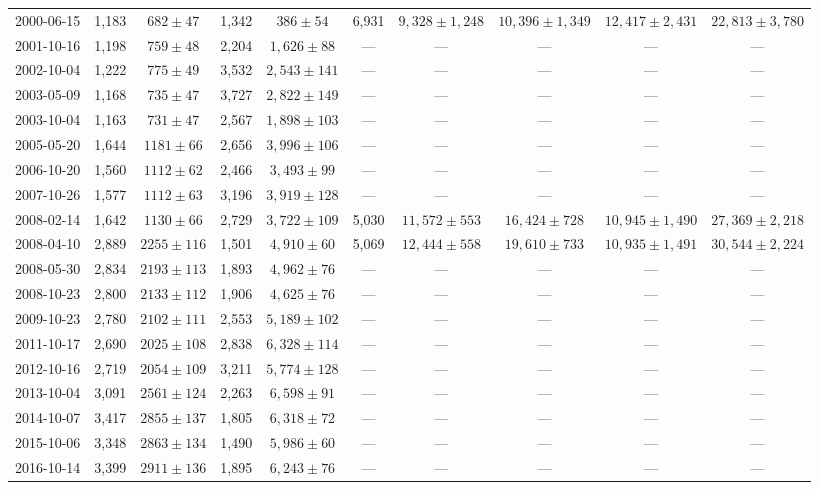 \begin{landscape}
\begin{longtable}{cccccccccc}
{2000-06-15} & 1,183 & {$682  \pm  47$} & 1,342 & {$386 \pm 54$} & 6,931 & {$9,328 \pm 1,248$} & {$10,396 \pm 1,349$} & {$12,417 \pm 2,431$} & {$22,813 \pm 3,780$} \\
{2001-10-16} & 1,198 & {$759  \pm  48$} & 2,204 & {$1,626 \pm 88$} & --- & --- & --- & --- & --- \\
{2002-10-04} & 1,222 & {$775  \pm  49$} & 3,532 & {$2,543 \pm 141$} & --- & --- & --- & --- & --- \\
{2003-05-09} & 1,168 & {$735  \pm  47$} & 3,727 & {$2,822 \pm 149$} & --- & --- & --- & --- & --- \\
{2003-10-04} & 1,163 & {$731  \pm  47$} & 2,567 & {$1,898 \pm 103$} & --- & --- & --- & --- & --- \\
{2005-05-20} & 1,644 & {$1181  \pm  66$} & 2,656 & {$3,996 \pm 106$} & --- & --- & --- & --- & --- \\
{2006-10-20} & 1,560 & {$1112  \pm  62$} & 2,466 & {$3,493 \pm 99$} & --- & --- & --- & --- & --- \\
{2007-10-26} & 1,577 & {$1112  \pm  63$} & 3,196 & {$3,919 \pm 128$} & --- & --- & --- & --- & --- \\
{2008-02-14} & 1,642 & {$1130  \pm  66$} & 2,729 & {$3,722 \pm 109$} & 5,030 & {$11,572 \pm 553$} & {$16,424 \pm 728$} & {$10,945 \pm 1,490$} & {$27,369 \pm 2,218$} \\
{2008-04-10} & 2,889 & {$2255  \pm  116$} & 1,501 & {$4,910 \pm 60$} & 5,069 & {$12,444 \pm 558$} & {$19,610 \pm 733$} & {$10,935 \pm 1,491$} & {$30,544 \pm 2,224$} \\
{2008-05-30} & 2,834 & {$2193  \pm  113$} & 1,893 & {$4,962 \pm 76$} & --- & --- & --- & --- & --- \\
{2008-10-23} & 2,800 & {$2133  \pm  112$} & 1,906 & {$4,625 \pm 76$} & --- & --- & --- & --- & --- \\
{2009-10-23} & 2,780 & {$2102  \pm  111$} & 2,553 & {$5,189 \pm 102$} & --- & --- & --- & --- & --- \\
{2011-10-17} & 2,690 & {$2025  \pm  108$} & 2,838 & {$6,328 \pm 114$} & --- & --- & --- & --- & --- \\
{2012-10-16} & 2,719 & {$2054  \pm  109$} & 3,211 & {$5,774 \pm 128$} & --- & --- & --- & --- & --- \\
{2013-10-04} & 3,091 & {$2561  \pm  124$} & 2,263 & {$6,598 \pm 91$} & --- & --- & --- & --- & --- \\
{2014-10-07} & 3,417 & {$2855  \pm  137$} & 1,805 & {$6,318 \pm 72$} & --- & --- & --- & --- & --- \\
{2015-10-06} & 3,348 & {$2863  \pm  134$} & 1,490 & {$5,986 \pm 60$} & --- & --- & --- & --- & --- \\
{2016-10-14} & 3,399 & {$2911  \pm  136$} & 1,895 & {$6,243 \pm 76$} & --- & --- & --- & --- & --- \\
\end{longtable} 
\end{landscape} 
